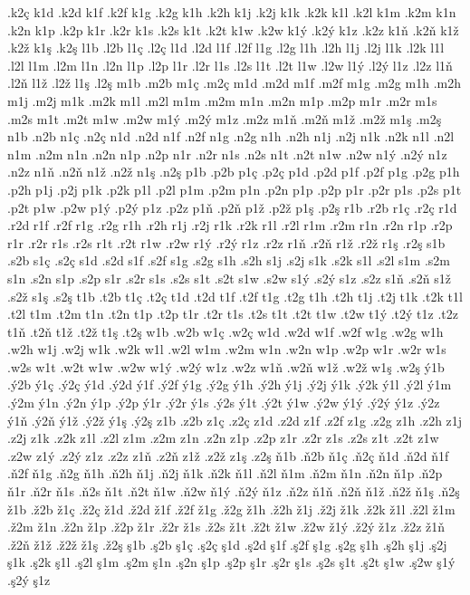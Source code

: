 {.k2ç
k1d
.k2d
k1f
.k2f
k1g
.k2g
k1h
.k2h
k1j
.k2j
k1k
.k2k
k1l
.k2l
k1m
.k2m
k1n
.k2n
k1p
.k2p
k1r
.k2r
k1s
.k2s
k1t
.k2t
k1w
.k2w
k1ý
.k2ý
k1z
.k2z
k1ň
.k2ň
k1ž
.k2ž
k1ş
.k2ş
l1b
.l2b
l1ç
.l2ç
l1d
.l2d
l1f
.l2f
l1g
.l2g
l1h
.l2h
l1j
.l2j
l1k
.l2k
l1l
.l2l
l1m
.l2m
l1n
.l2n
l1p
.l2p
l1r
.l2r
l1s
.l2s
l1t
.l2t
l1w
.l2w
l1ý
.l2ý
l1z
.l2z
l1ň
.l2ň
l1ž
.l2ž
l1ş
.l2ş
m1b
.m2b
m1ç
.m2ç
m1d
.m2d
m1f
.m2f
m1g
.m2g
m1h
.m2h
m1j
.m2j
m1k
.m2k
m1l
.m2l
m1m
.m2m
m1n
.m2n
m1p
.m2p
m1r
.m2r
m1s
.m2s
m1t
.m2t
m1w
.m2w
m1ý
.m2ý
m1z
.m2z
m1ň
.m2ň
m1ž
.m2ž
m1ş
.m2ş
n1b
.n2b
n1ç
.n2ç
n1d
.n2d
n1f
.n2f
n1g
.n2g
n1h
.n2h
n1j
.n2j
n1k
.n2k
n1l
.n2l
n1m
.n2m
n1n
.n2n
n1p
.n2p
n1r
.n2r
n1s
.n2s
n1t
.n2t
n1w
.n2w
n1ý
.n2ý
n1z
.n2z
n1ň
.n2ň
n1ž
.n2ž
n1ş
.n2ş
p1b
.p2b
p1ç
.p2ç
p1d
.p2d
p1f
.p2f
p1g
.p2g
p1h
.p2h
p1j
.p2j
p1k
.p2k
p1l
.p2l
p1m
.p2m
p1n
.p2n
p1p
.p2p
p1r
.p2r
p1s
.p2s
p1t
.p2t
p1w
.p2w
p1ý
.p2ý
p1z
.p2z
p1ň
.p2ň
p1ž
.p2ž
p1ş
.p2ş
r1b
.r2b
r1ç
.r2ç
r1d
.r2d
r1f
.r2f
r1g
.r2g
r1h
.r2h
r1j
.r2j
r1k
.r2k
r1l
.r2l
r1m
.r2m
r1n
.r2n
r1p
.r2p
r1r
.r2r
r1s
.r2s
r1t
.r2t
r1w
.r2w
r1ý
.r2ý
r1z
.r2z
r1ň
.r2ň
r1ž
.r2ž
r1ş
.r2ş
s1b
.s2b
s1ç
.s2ç
s1d
.s2d
s1f
.s2f
s1g
.s2g
s1h
.s2h
s1j
.s2j
s1k
.s2k
s1l
.s2l
s1m
.s2m
s1n
.s2n
s1p
.s2p
s1r
.s2r
s1s
.s2s
s1t
.s2t
s1w
.s2w
s1ý
.s2ý
s1z
.s2z
s1ň
.s2ň
s1ž
.s2ž
s1ş
.s2ş
t1b
.t2b
t1ç
.t2ç
t1d
.t2d
t1f
.t2f
t1g
.t2g
t1h
.t2h
t1j
.t2j
t1k
.t2k
t1l
.t2l
t1m
.t2m
t1n
.t2n
t1p
.t2p
t1r
.t2r
t1s
.t2s
t1t
.t2t
t1w
.t2w
t1ý
.t2ý
t1z
.t2z
t1ň
.t2ň
t1ž
.t2ž
t1ş
.t2ş
w1b
.w2b
w1ç
.w2ç
w1d
.w2d
w1f
.w2f
w1g
.w2g
w1h
.w2h
w1j
.w2j
w1k
.w2k
w1l
.w2l
w1m
.w2m
w1n
.w2n
w1p
.w2p
w1r
.w2r
w1s
.w2s
w1t
.w2t
w1w
.w2w
w1ý
.w2ý
w1z
.w2z
w1ň
.w2ň
w1ž
.w2ž
w1ş
.w2ş
ý1b
.ý2b
ý1ç
.ý2ç
ý1d
.ý2d
ý1f
.ý2f
ý1g
.ý2g
ý1h
.ý2h
ý1j
.ý2j
ý1k
.ý2k
ý1l
.ý2l
ý1m
.ý2m
ý1n
.ý2n
ý1p
.ý2p
ý1r
.ý2r
ý1s
.ý2s
ý1t
.ý2t
ý1w
.ý2w
ý1ý
.ý2ý
ý1z
.ý2z
ý1ň
.ý2ň
ý1ž
.ý2ž
ý1ş
.ý2ş
z1b
.z2b
z1ç
.z2ç
z1d
.z2d
z1f
.z2f
z1g
.z2g
z1h
.z2h
z1j
.z2j
z1k
.z2k
z1l
.z2l
z1m
.z2m
z1n
.z2n
z1p
.z2p
z1r
.z2r
z1s
.z2s
z1t
.z2t
z1w
.z2w
z1ý
.z2ý
z1z
.z2z
z1ň
.z2ň
z1ž
.z2ž
z1ş
.z2ş
ň1b
.ň2b
ň1ç
.ň2ç
ň1d
.ň2d
ň1f
.ň2f
ň1g
.ň2g
ň1h
.ň2h
ň1j
.ň2j
ň1k
.ň2k
ň1l
.ň2l
ň1m
.ň2m
ň1n
.ň2n
ň1p
.ň2p
ň1r
.ň2r
ň1s
.ň2s
ň1t
.ň2t
ň1w
.ň2w
ň1ý
.ň2ý
ň1z
.ň2z
ň1ň
.ň2ň
ň1ž
.ň2ž
ň1ş
.ň2ş
ž1b
.ž2b
ž1ç
.ž2ç
ž1d
.ž2d
ž1f
.ž2f
ž1g
.ž2g
ž1h
.ž2h
ž1j
.ž2j
ž1k
.ž2k
ž1l
.ž2l
ž1m
.ž2m
ž1n
.ž2n
ž1p
.ž2p
ž1r
.ž2r
ž1s
.ž2s
ž1t
.ž2t
ž1w
.ž2w
ž1ý
.ž2ý
ž1z
.ž2z
ž1ň
.ž2ň
ž1ž
.ž2ž
ž1ş
.ž2ş
ş1b
.ş2b
ş1ç
.ş2ç
ş1d
.ş2d
ş1f
.ş2f
ş1g
.ş2g
ş1h
.ş2h
ş1j
.ş2j
ş1k
.ş2k
ş1l
.ş2l
ş1m
.ş2m
ş1n
.ş2n
ş1p
.ş2p
ş1r
.ş2r
ş1s
.ş2s
ş1t
.ş2t
ş1w
.ş2w
ş1ý
.ş2ý
ş1z
}
